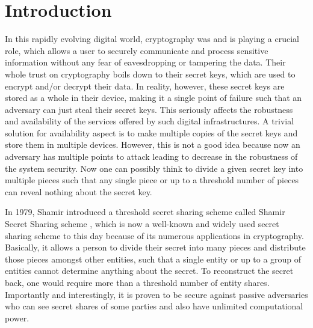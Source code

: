 \chapter{Introduction}
\label{cha:0}

In this rapidly evolving digital world, cryptography was and is playing a crucial role, which 
allows a user to securely communicate and process sensitive information without any 
fear of eavesdropping or tampering the data. Their whole trust on cryptography boils 
down to their secret keys, which are used to encrypt and/or decrypt their data. In 
reality, however, these secret keys are stored as a whole in their device, making it 
a single point of failure such that an adversary can just steal their secret keys. 
This seriously affects the robustness and availability of the services offered by 
such digital infrastructures. A trivial solution for availability aspect is to make 
multiple copies of the secret keys and store them in multiple devices. However, 
this is not a good idea because now an adversary has multiple points to attack leading 
to decrease in the robustness of the system security. Now one can possibly think to 
divide a given secret key into multiple pieces such that any single piece or up to a 
threshold number of pieces can reveal nothing about the secret key.\par 

In 1979, Shamir introduced a threshold secret sharing scheme called 
Shamir Secret Sharing scheme \cite{10.1145/359168.359176}, which is now a well-known 
and widely used secret sharing scheme to this day because of its numerous applications in
cryptography. Basically, it allows a person to divide their secret into many pieces and distribute 
those pieces amongst other entities, such that a single entity or up to a group of 
entities cannot determine anything about the secret. To reconstruct the secret back, 
one would require more than a threshold number of entity shares. Importantly and interestingly, it is proven to be 
secure against passive adversaries who can see secret shares of some parties and also have 
unlimited computational power.\par 

